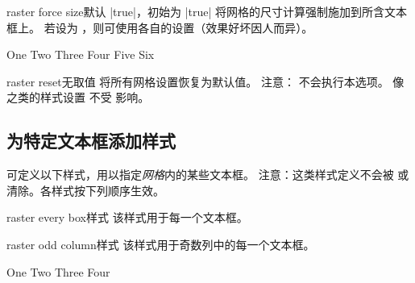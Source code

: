 \clearpage

\begin{docTcbKey}[][doc new=2014-11-10]{raster force size}{}{默认 |true|，初始为 |true|}
  将网格的尺寸计算强制施加到所含文本框上。
  若设为 ，则可使用各自的设置（效果好坏因人而异）。
\begin{dispExample}
\begin{tcbitemize}[raster force size=false, raster halign=center,
  size=small,colframe=red!50!black,colback=red!10!white]
  \tcbitem One
  \tcbitem Two
  \tcbitem[add to width=-3cm] Three
  \tcbitem[add to width=-3cm] Four
  \tcbitem[add to width=-3cm] Five
  \tcbitem[add to width=3cm] Six
\end{tcbitemize}
\end{dispExample}
\end{docTcbKey}



\begin{docTcbKey}[][doc new=2014-11-10]{raster reset}{}{无取值}
  将所有网格设置恢复为默认值。
  注意： 不会执行本选项。
  像  之类的样式设置
  不受  影响。
\end{docTcbKey}



\subsection{为特定文本框添加样式}\label{subsec:raster_styles}

可定义以下样式，用以指定\emph{网格}内的某些文本框。
注意：这类样式定义不会被  或
 清除。各样式按下列顺序生效。

\begin{docTcbKey}[][doc new=2014-11-24]{raster every box}{}{样式}
该样式用于每一个文本框。
\end{docTcbKey}

\begin{docTcbKey}[][doc new=2014-11-10]{raster odd column}{}{样式}
该样式用于奇数列中的每一个文本框。
\begin{dispExample}
\begin{tcbitemize}[size=small,colframe=red!50!black,colback=red!10!white,
  raster odd column/.style={colframe=blue!50!black,colback=blue!10!white}]
  \tcbitem One
  \tcbitem Two
  \tcbitem Three
  \tcbitem Four
\end{tcbitemize}
\end{dispExample}
\end{docTcbKey}


